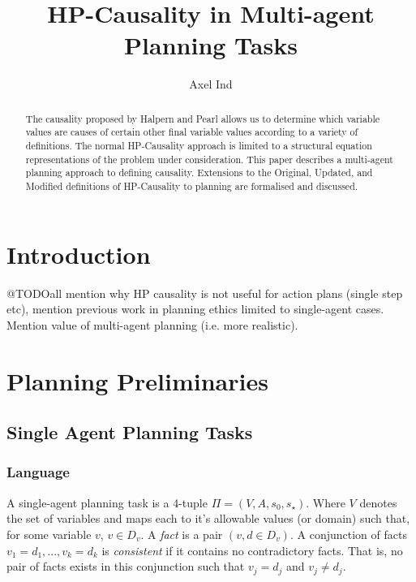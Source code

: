 \documentclass{article}
\theoremstyle{plain}
\theoremstyle{definition}
\begin{document}
\title{HP-Causality in Multi-agent Planning Tasks}
\author{Axel Ind}

\maketitle

\begin{abstract}
The causality proposed by Halpern and Pearl \cite{halpern2005causes} allows us to determine which variable values are causes of certain other final variable values according to a variety of definitions. The normal HP-Causality approach is limited to a structural equation representations of the problem under consideration. This paper describes a multi-agent planning approach to defining causality. Extensions to the Original, Updated, and Modified definitions of HP-Causality to planning are formalised and discussed.
\end{abstract}

\section{Introduction}
@TODOall mention why HP causality is not useful for action plans (single step etc), mention previous work in planning ethics limited to single-agent cases. Mention value of multi-agent planning (i.e. more realistic).

\section{Planning Preliminaries}

\subsection{Single Agent Planning Tasks}
\subsubsection*{Language}
A single-agent planning task is a 4-tuple $\Pi=(V, A, s_0, s_\star)$. Where $V$ denotes the set of variables and maps each to it's allowable values (or domain) such that, for some variable $v$, $v \in D_v$. A \textit{fact} is a pair $(v, d \in D_v)$. A conjunction of facts $v_1=d_1,...,v_k=d_k$ is \textit{consistent} if it contains no contradictory facts. That is, no pair of facts exists in this conjunction such that $v_j=d_j$ and $v_j \neq d_j$.
\end{document}
